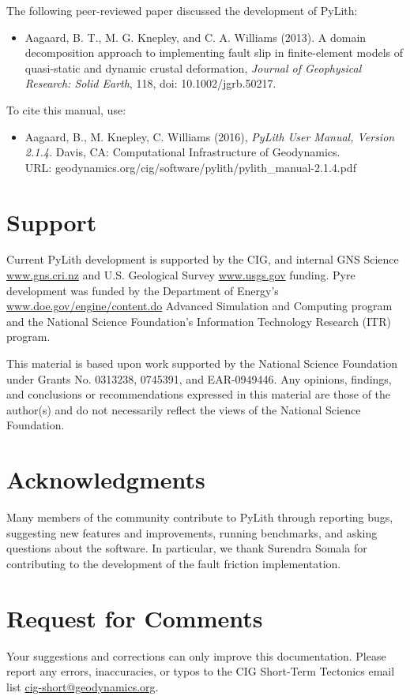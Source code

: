 The following peer-reviewed paper discussed the development of PyLith:
\begin{itemize}
\item Aagaard, B. T., M. G. Knepley, and C. A. Williams (2013). A domain
decomposition approach to implementing fault slip in finite-element
models of quasi-static and dynamic crustal deformation, \textit{Journal
of Geophysical Research: Solid Earth}, 118, doi: 10.1002/jgrb.50217.
\end{itemize}
To cite this manual, use:
\begin{itemize}
\item Aagaard, B., M. Knepley, C. Williams (2016), \emph{PyLith User Manual,
Version 2.1.4.} Davis, CA: Computational Infrastructure of Geodynamics.\\
URL: geodynamics.org/cig/software/pylith/pylith\_manual-2.1.4.pdf
\end{itemize}

\section{Support}

Current PyLith development is supported by the CIG, and internal GNS
Science \url{www.gns.cri.nz} and U.S. Geological Survey \url{www.usgs.gov}
funding. Pyre development was funded by the Department of Energy's
\url{www.doe.gov/engine/content.do} Advanced Simulation and Computing
program and the National Science Foundation's Information Technology
Research (ITR) program.

This material is based upon work supported by the National Science
Foundation under Grants No. 0313238, 0745391, and EAR-0949446. Any
opinions, findings, and conclusions or recommendations expressed in
this material are those of the author(s) and do not necessarily reflect
the views of the National Science Foundation.


\section{Acknowledgments}

Many members of the community contribute to PyLith through reporting
bugs, suggesting new features and improvements, running benchmarks,
and asking questions about the software. In particular, we thank Surendra
Somala for contributing to the development of the fault friction implementation.


\section{Request for Comments}

Your suggestions and corrections can only improve this documentation.
Please report any errors, inaccuracies, or typos to the CIG Short-Term
Tectonics email list \url{cig-short@geodynamics.org}. 

